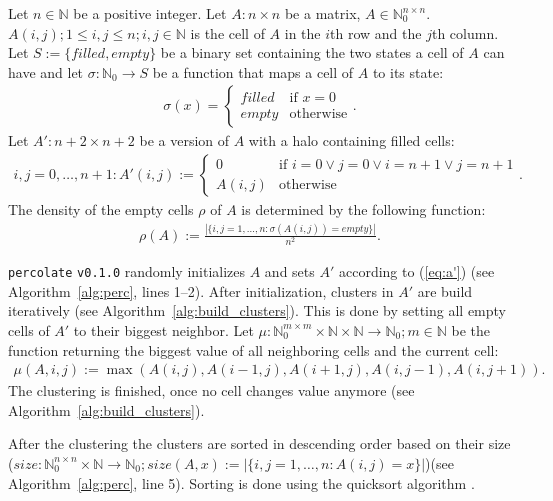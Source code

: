 \documentclass[twoside,11pt]{article}
\def\perc{\texttt{perco\-late}}
\def\v{\texttt{v0.1.0}}
\begin{document}
Let $n \in \mathbb{N}$ be a positive integer.
Let $A: n \times n$ be a matrix,
$A \in \mathbb{N}_{0}^{n \times n}$.
$A(i, j); 1 \leq i, j \leq n; i, j \in \mathbb{N}$ is
the cell of $A$ in the $i$th row and the $j$th column.
Let $S := \{filled, empty\}$ be a binary set containing the
two states a cell of $A$ can have and let $\sigma:
\mathbb{N}_0 \rightarrow S$ be a function that
maps a cell of $A$ to its state:
\begin{align*}
\sigma(x) = \begin{cases}
  filled &\text{if } x = 0 \\
  empty  &\text{otherwise}
\end{cases}.
\end{align*}
Let $A': n+2 \times n+2$ be a version of $A$ with a halo
containing filled cells:
\begin{align}
  \label{eq:a'}
i,j = 0, \dots, n+1: A'(i, j) := \begin{cases}
  0 &\text{if } i=0 \lor j=0 \lor i=n+1 \lor j=n+1 \\
  A(i, j) &\text{otherwise}
\end{cases}.
\end{align}
The density of the empty cells $\rho$ of $A$ is determined
by the following function:
\begin{align*}
\rho(A) := \frac{|\{i,j=1,\dots,n: \sigma(A(i,j)) = empty\}|}{n^2}.
\end{align*}

\perc{} \v{} randomly initializes $A$ and sets $A'$
according to (\ref{eq:a'}) (see Algorithm~\ref{alg:perc},
lines 1--2).
After initialization, clusters in $A'$ are build
iteratively (see Algorithm~\ref{alg:build_clusters}).
This is done by setting all empty cells of $A'$ to their
biggest neighbor.
Let $\mu:\mathbb{N}_0^{m \times m} \times \mathbb{N} \times
\mathbb{N} \rightarrow \mathbb{N}_0; m \in \mathbb{N}$ be
the function returning the biggest value of all neighboring
cells and the current cell:
\begin{align*}
  \mu(A, i, j) := \max(A(i, j), A(i-1, j), A(i+1, j),
                       A(i, j-1), A(i, j+1)).
\end{align*}
The clustering is finished, once no cell changes value
anymore (see Algorithm~\ref{alg:build_clusters}).

After the clustering the clusters are sorted in descending
order based on their size
($size: \mathbb{N}_0^{n \times n} \times \mathbb{N}
\rightarrow \mathbb{N}_0; size(A, x) :=
|\{i,j=1,\dots,n: A(i,j) = x\}|$)(see
Algorithm~\ref{alg:perc}, line 5).
Sorting is done using the quicksort algorithm
\citep[see][]{hoare_1961}.
\end{document}
